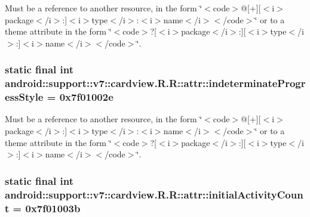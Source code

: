 Must be a reference to another resource, in the form \char`\"{}$<$code$>$@\mbox{[}+\mbox{]}\mbox{[}$<$i$>$package$<$/i$>$:\mbox{]}$<$i$>$type$<$/i$>$:$<$i$>$name$<$/i$>$$<$/code$>$\char`\"{} or to a theme attribute in the form \char`\"{}$<$code$>$?\mbox{[}$<$i$>$package$<$/i$>$:\mbox{]}\mbox{[}$<$i$>$type$<$/i$>$:\mbox{]}$<$i$>$name$<$/i$>$$<$/code$>$\char`\"{}. \hypertarget{classandroid_1_1support_1_1v7_1_1cardview_1_1_r_1_1attr_7d32843f126e39bc6ee5b7cd981ba613}{
\subsubsection[{indeterminateProgressStyle}]{\setlength{\rightskip}{0pt plus 5cm}static final int android::support::v7::cardview.R.R::attr::indeterminateProgressStyle = 0x7f01002e}}
\label{classandroid_1_1support_1_1v7_1_1cardview_1_1_r_1_1attr_7d32843f126e39bc6ee5b7cd981ba613}


Must be a reference to another resource, in the form \char`\"{}$<$code$>$@\mbox{[}+\mbox{]}\mbox{[}$<$i$>$package$<$/i$>$:\mbox{]}$<$i$>$type$<$/i$>$:$<$i$>$name$<$/i$>$$<$/code$>$\char`\"{} or to a theme attribute in the form \char`\"{}$<$code$>$?\mbox{[}$<$i$>$package$<$/i$>$:\mbox{]}\mbox{[}$<$i$>$type$<$/i$>$:\mbox{]}$<$i$>$name$<$/i$>$$<$/code$>$\char`\"{}. \hypertarget{classandroid_1_1support_1_1v7_1_1cardview_1_1_r_1_1attr_96e5cbc0898cb984f48973d708f52c4d}{
\subsubsection[{initialActivityCount}]{\setlength{\rightskip}{0pt plus 5cm}static final int android::support::v7::cardview.R.R::attr::initialActivityCount = 0x7f01003b}}
\label{classandroid_1_1support_1_1v7_1_1cardview_1_1_r_1_1attr_96e5cbc0898cb984f48973d708f52c4d}


